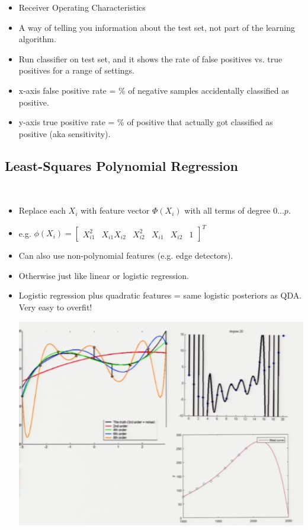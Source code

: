 \documentclass[10pt]{article}
\begin{document}
\begin{itemize}
\begin{center}
						\end{center}
						\begin{itemize}
							\item Receiver Operating Characteristics 
							\item A way of telling you information about the test set, not part of the learning algorithm.
							\item Run classifier on test set, and it shows the rate of false positives vs. true positives for a range of settings.
							\item x-axis false positive rate = \% of negative samples accidentally classified as positive.
							\item y-axis true positive rate = \% of positive that actually got classified as positive (aka sensitivity).
						\end{itemize}
				\end{itemize}
				
		\subsection*{Least-Squares Polynomial Regression}
				\
					\begin{itemize}
						\item Replace each $X_{i}$ with feature vector $\Phi(X_{i})$ with all terms of degree $0 \dots p$.
						\item e.g. $\phi(X_{i}) = \begin{bmatrix}
												X_{i1}^{2} & X_{i1}X_{i2} & X_{i2}^{2} & X_{i1} & X_{i2} & 1 
 											\end{bmatrix}^{T}
 											$
 						\item Can also use non-polynomial features (e.g. edge detectors).
 						\item Otherwise just like linear or logistic regression.
 						\item Logistic regression plus quadratic features = same logistic posteriors as QDA. Very easy to overfit!
							\begin{center}
								\includegraphics[scale=0.5]{images/polyregression}
							\end{center}
					\end{itemize}
\end{document}
